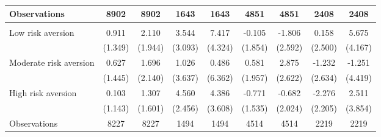 {\begin{tabular}{l*{8}{c}}
\midrule
Observations    &     8902         &     8902         &     1643         &     1643         &     4851         &     4851         &     2408         &     2408         \\



\midrule
\addlinespace
\multicolumn{9}{l}{\textit{Panel D: Cognitive stimulation score (\%)}} \\
\addlinespace
Low risk aversion&    0.911         &    2.110         &    3.544         &    7.417\sym{*}  &   -0.105         &   -1.806         &    0.158         &    5.675         \\
                &  (1.349)         &  (1.944)         &  (3.093)         &  (4.324)         &  (1.854)         &  (2.592)         &  (2.500)         &  (4.167)         \\
\addlinespace
Moderate risk aversion&    0.627         &    1.696         &    1.026         &    0.486         &    0.581         &    2.875         &   -1.232         &   -1.251         \\
                &  (1.445)         &  (2.140)         &  (3.637)         &  (6.362)         &  (1.957)         &  (2.622)         &  (2.634)         &  (4.419)         \\
\addlinespace
High risk aversion&    0.103         &    1.307         &    4.560\sym{*}  &    4.386         &   -0.771         &   -0.682         &   -2.276         &    2.511         \\
                &  (1.143)         &  (1.601)         &  (2.456)         &  (3.608)         &  (1.535)         &  (2.024)         &  (2.205)         &  (3.854)         \\

\midrule
Observations    &     8227         &     8227         &     1494         &     1494         &     4514         &     4514         &     2219         &     2219         \\




\end{tabular}}
